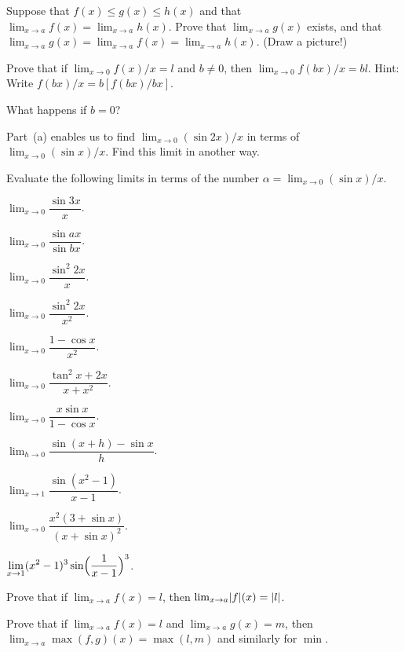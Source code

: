 Suppose that $f(x)\leq g(x)\leq h(x)$ and that
$\lim_{x\to a}f(x)=\lim_{x\to a}h(x)$. Prove that $\lim_{x\to a}g(x)$ exists,
and that $\lim_{x\to a}g(x)=\lim_{x\to a}f(x)=\lim_{x\to a}h(x)$. (Draw a
picture!)

\begin{letters}
\item Prove that if $\lim_{x\to 0}f(x)/x=l$ and $b\neq 0$, then
$\lim_{x\to 0}f(bx)/x=bl$. Hint: Write $f(bx)/x=b[f(bx)/bx]$.
\item What happens if $b=0$?
\item Part~(a) enables us to find $\lim_{x\to 0}(\sin 2x)/x$ in terms of
$\lim_{x\to 0}(\sin x)/x$. Find this limit in another way.
\end{letters}

Evaluate the following limits in terms of the number
$\alpha=\lim_{x\to 0}(\sin x)/x$.
\begin{romans}
\item $\displaystyle\lim_{x\to 0}\dfrac{\sin 3x}{x}$.
\item $\displaystyle\lim_{x\to 0}\dfrac{\sin ax}{\sin bx}$.
\item $\displaystyle\lim_{x\to 0}\dfrac{\sin^2 2x}{x}$.
\item $\displaystyle\lim_{x\to 0}\dfrac{\sin^2 2x}{x^2}$.
\item $\displaystyle\lim_{x\to 0}\dfrac{1-\cos x}{x^2}$.
\item $\displaystyle\lim_{x\to 0}\dfrac{\tan^2 x+2x}{x+x^2}$.
\item $\displaystyle\lim_{x\to 0}\dfrac{x\sin x}{1-\cos x}$.
\item $\displaystyle\lim_{h\to 0}\dfrac{\sin(x+h)-\sin x}{h}$.
\item $\displaystyle\lim_{x\to 1}\dfrac{\sin(x^2-1)}{x-1}$.
\item $\displaystyle\lim_{x\to 0}\dfrac{x^2(3+\sin x)}{(x+\sin x)^2}$.
\item $\displaystyle\lim_{x\to 1}(x^2-1)^3\sin\Bigl(\dfrac{1}{x-1}\Bigr)^3$.
\end{romans}

\begin{letters}
\item Prove that if $\lim_{x\to a}f(x)=l$, then
$\lim_{x\to a}\lvert f\rvert(x)=\lvert l\rvert$.
\item Prove that if $\lim_{x\to a}f(x)=l$ and $\lim_{x\to a}g(x)=m$, then
$\lim_{x\to a}\max(f,g)(x)=\max(l,m)$ and similarly for $\min$.
\end{letters}

